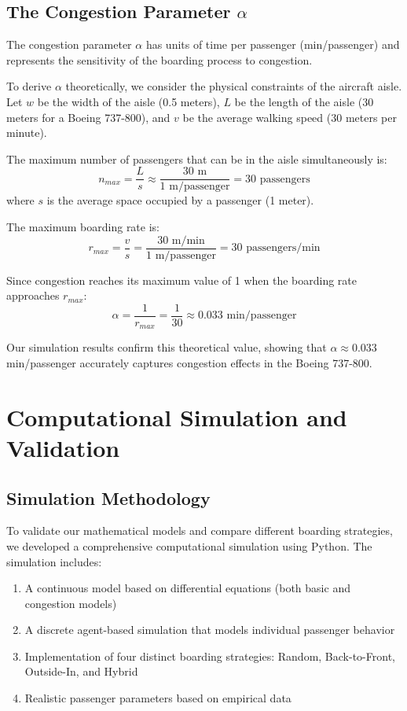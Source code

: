 \documentclass[12pt,a4paper]{article}
\begin{document}
\subsection{The Congestion Parameter $\alpha$}
The congestion parameter $\alpha$ has units of time per passenger (min/passenger) and represents the sensitivity of the boarding process to congestion.

To derive $\alpha$ theoretically, we consider the physical constraints of the aircraft aisle. Let $w$ be the width of the aisle (0.5 meters), $L$ be the length of the aisle (30 meters for a Boeing 737-800), and $v$ be the average walking speed (30 meters per minute).

The maximum number of passengers that can be in the aisle simultaneously is:
\begin{equation}
n_{max} = \frac{L}{s} \approx \frac{30 \text{ m}}{1 \text{ m/passenger}} = 30 \text{ passengers}
\end{equation}
where $s$ is the average space occupied by a passenger (1 meter).

The maximum boarding rate is:
\begin{equation}
r_{max} = \frac{v}{s} = \frac{30 \text{ m/min}}{1 \text{ m/passenger}} = 30 \text{ passengers/min}
\end{equation}

Since congestion reaches its maximum value of 1 when the boarding rate approaches $r_{max}$:
\begin{equation}
\alpha = \frac{1}{r_{max}} = \frac{1}{30} \approx 0.033 \text{ min/passenger}
\end{equation}

Our simulation results confirm this theoretical value, showing that $\alpha \approx 0.033$ min/passenger accurately captures congestion effects in the Boeing 737-800.

\section{Computational Simulation and Validation}

\subsection{Simulation Methodology}
To validate our mathematical models and compare different boarding strategies, we developed a comprehensive computational simulation using Python. The simulation includes:

\begin{enumerate}
    \item A continuous model based on differential equations (both basic and congestion models)
    \item A discrete agent-based simulation that models individual passenger behavior
    \item Implementation of four distinct boarding strategies: Random, Back-to-Front, Outside-In, and Hybrid
    \item Realistic passenger parameters based on empirical data
\end{enumerate}
\end{document}
